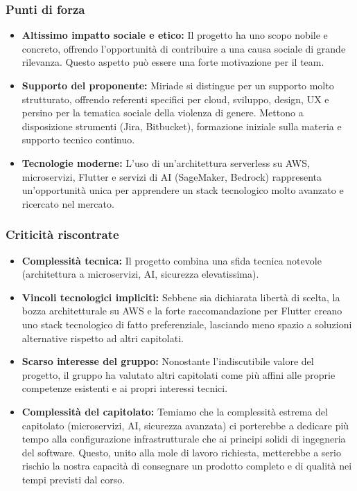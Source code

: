 \documentclass{article}
\begin{document}
	\subsubsection{Punti di forza}
	\begin{itemize}
		\item \textbf{Altissimo impatto sociale e etico:} Il progetto ha uno scopo nobile e concreto, offrendo l'opportunità di contribuire a una causa sociale di grande rilevanza. Questo aspetto può essere una forte motivazione per il team.
		\item \textbf{Supporto del proponente:} Miriade si distingue per un supporto molto strutturato, offrendo referenti specifici per cloud, sviluppo, design, UX e persino per la tematica sociale della violenza di genere. Mettono a disposizione strumenti (Jira, Bitbucket), formazione iniziale sulla materia e supporto tecnico continuo.
		\item \textbf{Tecnologie moderne:} L'uso di un'architettura serverless su AWS, microservizi, Flutter e servizi di AI (SageMaker, Bedrock) rappresenta un'opportunità unica per apprendere un stack tecnologico molto avanzato e ricercato nel mercato.
    \end{itemize}
	
	\subsubsection{Criticità riscontrate}
	\begin{itemize}
		\item \textbf{Complessità tecnica:} Il progetto combina una sfida tecnica notevole (architettura a microservizi, AI, sicurezza elevatissima).
		\item \textbf{Vincoli tecnologici impliciti:} Sebbene sia dichiarata libertà di scelta, la bozza architetturale su AWS e la forte raccomandazione per Flutter creano uno stack tecnologico di fatto preferenziale, lasciando meno spazio a soluzioni alternative rispetto ad altri capitolati.
		\item \textbf{Scarso interesse del gruppo:} Nonostante l'indiscutibile valore del progetto, il gruppo ha valutato altri capitolati come più affini alle proprie competenze esistenti e ai propri interessi tecnici.
        \item \textbf{Complessità del capitolato:} Temiamo che la complessità estrema del capitolato (microservizi, AI, sicurezza avanzata) ci porterebbe a dedicare più tempo alla configurazione infrastrutturale che ai principi solidi di ingegneria del software. Questo, unito alla mole di lavoro richiesta, metterebbe a serio rischio la nostra capacità di consegnare un prodotto completo e di qualità nei tempi previsti dal corso.
    \end{itemize}
	
\end{document}
